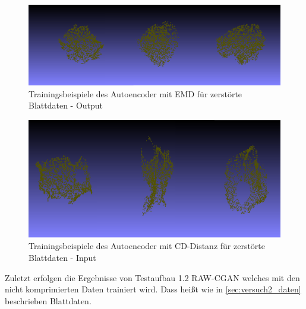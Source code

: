 \documentclass{llncs}
\begin{document}
\begin{figure}[htbp] 
	\centering
	\includegraphics[width=1.0\textwidth]{autoencoder_destroyed_example.png}
	\caption{Trainingsbeispiele des Autoencoder mit EMD für zerstörte Blattdaten - Output}
	\label{fig:Bild72}
\end{figure}

\begin{figure}[htbp] 
	\centering
	\includegraphics[width=1.0\textwidth]{autoencoder_destroyed_example_chamfer_real.png}
	\caption{Trainingsbeispiele des Autoencoder mit CD-Distanz für zerstörte Blattdaten - Input}
	\label{fig:Bild69}
\end{figure}

\newpage
Zuletzt erfolgen die Ergebnisse von Testaufbau 1.2 RAW-CGAN welches mit den nicht komprimierten Daten trainiert wird. Dass heißt wie in \ref{sec:versuch2_daten} beschrieben Blattdaten. 
\end{document}
